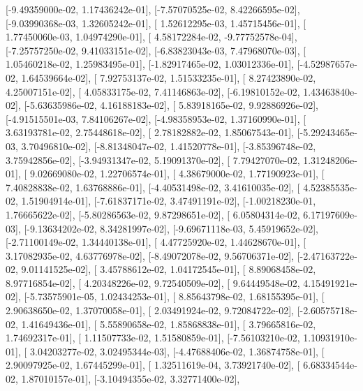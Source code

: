 \documentclass{article}
\begin{document}
       [-9.49359000e-02,  1.17436242e-01],
       [-7.57070525e-02,  8.42266595e-02],
       [-9.03990368e-03,  1.32605242e-01],
       [ 1.52612295e-03,  1.45715456e-01],
       [ 1.77450060e-03,  1.04974290e-01],
       [ 4.58172284e-02, -9.77752578e-04],
       [-7.25757250e-02,  9.41033151e-02],
       [-6.83823043e-03,  7.47968070e-03],
       [ 1.05460218e-02,  1.25983495e-01],
       [-1.82917465e-02,  1.03012336e-01],
       [-4.52987657e-02,  1.64539664e-02],
       [ 7.92753137e-02,  1.51533235e-01],
       [ 8.27423890e-02,  4.25007151e-02],
       [ 4.05833175e-02,  7.41146863e-02],
       [-6.19810152e-02,  1.43463840e-02],
       [-5.63635986e-02,  4.16188183e-02],
       [ 5.83918165e-02,  9.92886926e-02],
       [-4.91515501e-03,  7.84106267e-02],
       [-4.98358953e-02,  1.37160990e-01],
       [ 3.63193781e-02,  2.75448618e-02],
       [ 2.78182882e-02,  1.85067543e-01],
       [-5.29243465e-03,  3.70496810e-02],
       [-8.81348047e-02,  1.41520778e-01],
       [-3.85396748e-02,  3.75942856e-02],
       [-3.94931347e-02,  5.19091370e-02],
       [ 7.79427070e-02,  1.31248206e-01],
       [ 9.02669080e-02,  1.22706574e-01],
       [ 4.38679000e-02,  1.77190923e-01],
       [ 7.40828838e-02,  1.63768886e-01],
       [-4.40531498e-02,  3.41610035e-02],
       [ 4.52385535e-02,  1.51904914e-01],
       [-7.61837171e-02,  3.47491191e-02],
       [-1.00218230e-01,  1.76665622e-02],
       [-5.80286563e-02,  9.87298651e-02],
       [ 6.05804314e-02,  6.17197609e-03],
       [-9.13634202e-02,  8.34281997e-02],
       [-9.69671118e-03,  5.45919652e-02],
       [-2.71100149e-02,  1.34440138e-01],
       [ 4.47725920e-02,  1.44628670e-01],
       [ 3.17082935e-02,  4.63776978e-02],
       [-8.49072078e-02,  9.56706371e-02],
       [-2.47163722e-02,  9.01141525e-02],
       [ 3.45788612e-02,  1.04172545e-01],
       [ 8.89068458e-02,  8.97716854e-02],
       [ 4.20348226e-02,  9.72540509e-02],
       [ 9.64449548e-02,  4.15491921e-02],
       [-5.73575901e-05,  1.02434253e-01],
       [ 8.85643798e-02,  1.68155395e-01],
       [ 2.90638650e-02,  1.37070058e-01],
       [ 2.03491924e-02,  9.72084722e-02],
       [-2.60575718e-02,  1.41649436e-01],
       [ 5.55890658e-02,  1.85868838e-01],
       [ 3.79665816e-02,  1.74692317e-01],
       [ 1.11507733e-02,  1.51580859e-01],
       [-7.56103210e-02,  1.10931910e-01],
       [ 3.04203277e-02,  3.02495344e-03],
       [-4.47688406e-02,  1.36874758e-01],
       [ 2.90097925e-02,  1.67445299e-01],
       [ 1.32511619e-04,  3.73921740e-02],
       [ 6.68334544e-02,  1.87010157e-01],
       [-3.10494355e-02,  3.32771400e-02],
\end{document}
